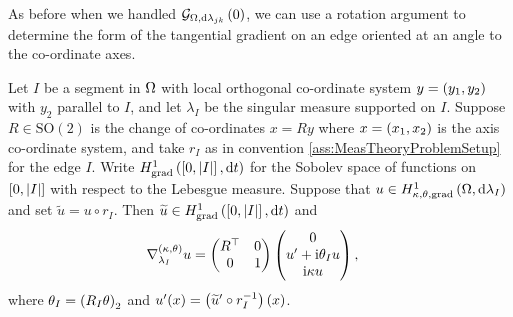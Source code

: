 As before when we handled $\mathcal{G}_{ \Omega, \mathrm{d}\lambda_{jk}}\left( 0 \right)$, we can use a rotation argument to determine the form of the tangential gradient on an edge oriented at an angle to the co-ordinate axes.
\begin{cory} \label{cory:3DTangGradRotated}
	Let $I$ be a segment in $\Omega$ with local orthogonal co-ordinate system  $y=\left( y_1,y_2 \right)$ with $y_2$ parallel to $I$, and let $\lambda_I$ be the singular measure supported on $I$.
	Suppose $R\in\mathrm{SO}(2)$ is the change of co-ordinates $x=Ry$ where $x=\left( x_1,x_2 \right)$ is the axis co-ordinate system, and take $r_I$ as in convention \ref{ass:MeasTheoryProblemSetup} for the edge $I$.
	Write $H^1_\mathrm{grad}\left( \left[ 0,\left\lvert I \right\rvert \right], \mathrm{d}t \right)$ for the Sobolev space of functions on $\left[ 0,\left\lvert I \right\rvert \right]$ with respect to the Lebesgue measure.
	Suppose that $u\in H^1_{\kappa,\theta,\mathrm{grad}}\left( \Omega, \mathrm{d}\lambda_I \right)$ and set $\widetilde{u} = u \circ r_I$.
	Then $\widetilde{u}\in H^1_\mathrm{grad}\left( \left[ 0,\left\lvert I \right\rvert \right], \mathrm{d}t \right)$ and
	\begin{align*}
		\nabla^{\left( \kappa, \theta \right)}_{\lambda_I} u &= 
		\begin{pmatrix} R^{\top} & 0 \\ 0 & 1	\end{pmatrix}
		\begin{pmatrix} 0 \\ u' + \mathrm{i}\theta_{I}u \\ \mathrm{i}\kappa u \end{pmatrix},
	\end{align*}
	where $\theta_I = \left( R_I\theta \right)_2$ and $u'(x) = \left( \widetilde{u}'\circ r_I^{-1} \right)(x)$.
\end{cory}

